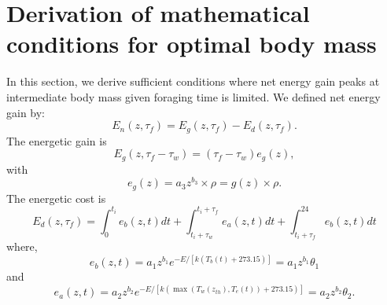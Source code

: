 \documentclass[11pt]{article}
\begin{document}
\section{Derivation of  mathematical conditions for optimal body mass}
In this section, we derive sufficient conditions where net energy gain peaks at intermediate body mass given foraging time is limited.
We defined net energy gain by:
\begin{equation} \label{eq:main}
	E_n(z, \tau_f) = E_g(z,\tau_f) - E_d(z, \tau_f).
\end{equation}
The energetic gain is
\[
	E_g(z,\tau_f - \tau_w) = (\tau_f - \tau_w) e_g(z),
\]
with
\begin{equation} \label{eq:eg}
	e_g(z) = a_3 z^{b_3} \times \rho  = g(z) \times \rho.
\end{equation}
%
The energetic cost is
\begin{equation} \label{eq:ed}
	E_d(z, \tau_f) = \int_0^{t_i} e_b(z, t) dt + \int_{t_i + \tau_w}^{t_i + \tau_f } e_a(z,t) dt + \int_{t_i+\tau_f}^{24} e_b(z, t) dt
\end{equation}
where,
\begin{equation} \label{eq:eb}
	e_b(z, t) = a_1 z^{b_1} e^{-E/[k (T_b(t)+ 273.15)]} =  a_1 z^{b_1} \theta_1
\end{equation}
and
\begin{equation} \label{eq:ea}
	e_a(z,t) = a_2 z^{b_2}  e^{-E/[k (\max(T_w(z_{th}), T_e(t))+ 273.15)]} =  a_2 z^{b_2} \theta_2.
\end{equation}
\end{document}
